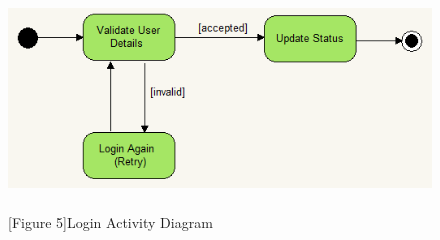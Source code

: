 \documentclass[29pt,a4paper]{moderncv}
\begin{document}
						\\ \begin{figure}
							\centering
						\\	\includegraphics[width=5.5in, height=2.0in]{./acLogin.png}
							\\\caption{[Figure 5]Login Activity Diagram}
						\end{figure}	\\
\end{document}
